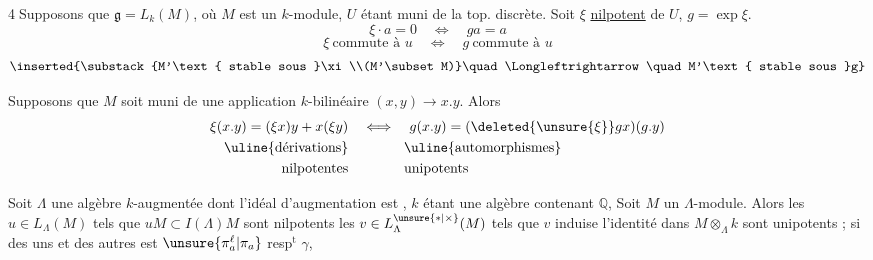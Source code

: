 \textcircled{4}\quad Supposons que $\mathfrak g=L_k(M)$, où $M$ est un $k$-module,
$U$ étant muni de la top. discrète.
Soit $\xi$ \uline{nilpotent} de $U$, $g=\exp\xi$.
\[
\xi\cdot a=0\quad\Longleftrightarrow\quad ga=a
\]
\[
\xi\ \text{commute à }u\quad\Longleftrightarrow\quad g\ \text{commute à }u
\]
\[
\inserted{\substack{M'\text{ stable sous }\xi\\(M'\subset M)}\quad\Longleftrightarrow\quad M'\text{ stable sous }g}
\]

Supposons que $M$ soit muni de une
application $k$-bilinéaire $(x,y)\longrightarrow x.y$. Alors
\[
\begin{aligned}
\xi(x.y)=(\xi x)y+x(\xi y)&\quad\Longleftrightarrow\quad g(x.y)=(\deleted{\unsure{\xi}}g x)(g.y)\\
\text{\uline{dérivations}}&\hspace{4em}\text{\uline{automorphismes}}\\
\text{nilpotentes}&\hspace{4em}\text{unipotents}
\end{aligned}
\]


Soit $\Lambda$ une algèbre $k$-augmentée dont l'idéal
d'augmentation est , $k$ étant une
algèbre contenant $\mathbb Q$, Soit $M$ un $\Lambda$-module.
Alors les $u\in L_\Lambda(M)$ tels que $uM\subset I(\Lambda)M$
sont nilpotents  les
$v\in L_\Lambda^{\unsure{*|\times}}(M)$ tels que $v$ induise l'identité
dans $M\otimes_\Lambda k$ sont unipotents ; si 
des uns et des autres est $\unsure{\pi^\ell_a|\pi_a}$ resp$^{\mathrm t}$ $\gamma$,

